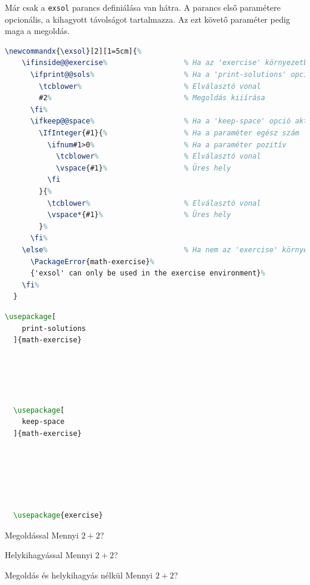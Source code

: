 Már csak a \texttt{exsol} parancs definiálása van hátra. A parancs első
paramétere opcionális, a kihagyott távolságot tartalmazza. Az ezt követő
paraméter pedig maga a megoldás.

\begin{lstlisting}[language=tex,caption={Az \texttt{exsol} parancs}]
  \newcommandx{\exsol}[2][1=5cm]{%
    \ifinside@@exercise%                  % Ha az 'exercise' környezetben vagyunk
      \ifprint@@sols%                     % Ha a 'print-solutions' opció aktív
        \tcblower%                        % Elválasztó vonal
        #2%                               % Megoldás kiiírása
      \fi%
      \ifkeep@@space%                     % Ha a 'keep-space' opció aktív
        \IfInteger{#1}{%                  % Ha a paraméter egész szám
          \ifnum#1>0%                     % Ha a paraméter pozitív
            \tcblower%                    % Elválasztó vonal
            \vspace{#1}%                  % Üres hely
          \fi
        }{%
          \tcblower%                      % Elválasztó vonal
          \vspace*{#1}%                   % Üres hely
        }%
      \fi%
    \else%                                % Ha nem az 'exercise' környezetben vagyunk
      \PackageError{math-exercise}%
      {'exsol' can only be used in the exercise environment}%
    \fi%
  }
\end{lstlisting}

\begin{minipage}[t]{.33\textwidth}
	\begin{lstlisting}[language=tex,caption={Csomag használata}]
  \usepackage[
    print-solutions
  ]{math-exercise}





  \usepackage[
    keep-space
  ]{math-exercise}






  \usepackage{exercise}


  \end{lstlisting}
\end{minipage}\hfill
\begin{minipage}[t]{.55\textwidth}
	\begin{exercise}{Megoldással}
		Mennyi $2+2$?

		\exsol{%
			\vspace{-8mm}
			\[
				2 + 2 = 4
			\]
			\vspace{-10mm}
		}
	\end{exercise}
	\vspace{-1.5mm}

	\makeatletter
	\print@@solsfalse
	\keep@@spacetrue
	\begin{exercise}{Helykihagyással}
		Mennyi $2+2$?

		\exsol[11mm]{}
	\end{exercise}
	\vspace{-1.5mm}

	\keep@@spacefalse
	\begin{exercise}{Megoldás és helykihagyás nélkül}
		Mennyi $2+2$?
	\end{exercise}
	\makeatother
\end{minipage}


